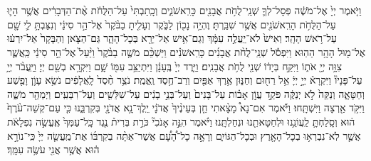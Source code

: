\documentclass[twoside, openany, parskip=half, 11pt]{book}
\begin{document}
\begin{footnotesize}
\begin{multicols}{2}

\\
\\
וַיֹּ֤אמֶר יְיָ֙ אֶל־מֹשֶׁ֔ה פְּסָל־לְךָ֛ שְׁנֵֽי־לֻחֹ֥ת אֲבָנִ֖ים כָּרִֽאשֹׁנִ֑ים וְכָֽתַבְתִּי֙ עַל־הַלֻּחֹ֔ת אֶ֨ת־הַדְּבָרִ֔ים אֲשֶׁ֥ר הָי֛וּ עַל־הַלֻּחֹ֥ת הָרִֽאשֹׁנִ֖ים אֲשֶׁ֥ר שִׁבַּֽרְתָּ׃ וֶהְיֵ֥ה נָכ֖וֹן לַבֹּ֑קֶר וְעָלִ֤יתָ בַבֹּ֨קֶר֙ אֶל־הַ֣ר סִינַ֔י וְנִצַּבְתָּ֥ לִ֛י שָׁ֖ם עַל־רֹ֥אשׁ הָהָֽר׃ וְאִישׁ֙ לֹא־יַֽעֲלֶ֣ה עִמָּ֔ךְ וְגַם־אִ֥ישׁ אַל־יֵרָ֖א בְּכָל־הָהָ֑ר גַּם־הַצֹּ֤אן וְהַבָּקָר֙ אַל־יִרְע֔וּ אֶל־מ֖וּל הָהָ֥ר הַהֽוּא׃ וַיִּפְסֹ֡ל שְׁנֵֽי־לֻחֹ֨ת אֲבָנִ֜ים כָּרִֽאשֹׁנִ֗ים וַיַּשְׁכֵּ֨ם מֹשֶׁ֤ה בַבֹּ֨קֶר֙ וַיַּ֨עַל֙ אֶל־הַ֣ר סִינַ֔י כַּֽאֲשֶׁ֛ר צִוָּ֥ה יְיָ֖ אֹת֑וֹ וַיִּקַּ֣ח בְּיָד֔וֹ שְׁנֵ֖י לֻחֹ֥ת אֲבָנִֽים׃ וַיֵּ֤רֶד יְיָ֙ בֶּֽעָנָ֔ן וַיִּתְיַצֵּ֥ב עִמּ֖וֹ שָׁ֑ם וַיִּקְרָ֥א בְשֵׁ֖ם יְיָ׃ וַיַּֽעֲבֹ֨ר יְיָ֥ עַל־פָּנָיו֘ וַיִּקְרָא֒ יְיָ֣ יְיָ֔ אֵ֥ל רַח֖וּם וְחַנּ֑וּן אֶ֥רֶךְ אַפַּ֖יִם וְרַב־חֶ֥סֶד וֶֽאֱמֶֽת׃ נֹצֵ֥ר חֶ֨סֶד֙ לָֽאֲלָפִ֔ים נֹשֵׂ֥א עָוֹ֛ן וָפֶ֖שַׁע וְחַטָּאָ֑ה וְנַקֵּה֙ לֹ֣א יְנַקֶּ֔ה פֹּקֵ֣ד עֲוֹ֣ן אָב֗וֹת עַל־בָּנִים֙ וְעַל־בְּנֵ֣י בָנִ֔ים עַל־שִׁלֵּשִׁ֖ים וְעַל־רִבֵּעִֽים׃ וַיְמַהֵ֖ר מֹשֶׁ֑ה וַיִּקֹּ֥ד אַ֖רְצָה וַיִּשְׁתָּֽחוּ׃ וַיֹּ֡אמֶר אִם־נָא֩ מָצָ֨אתִי חֵ֤ן בְּעֵינֶ֨יךָ֙ אֲדֹנָ֔י יֵֽלֶךְ־נָ֥א אֲדֹנָ֖י בְּקִרְבֵּ֑נוּ כִּ֤י עַם־קְשֵׁה־עֹ֨רֶף֙ ה֔וּא וְסָֽלַחְתָּ֛ לַֽעֲוֹנֵ֥נוּ וּלְחַטָּאתֵ֖נוּ וּנְחַלְתָּֽנוּ׃ וַיֹּ֗אמֶר הִנֵּ֣ה אָנֹכִי֘ כֹּרֵ֣ת בְּרִית֒ נֶ֤גֶד כָּֽל־עַמְּךָ֙ אֶֽעֱשֶׂ֣ה נִפְלָאֹ֔ת אֲשֶׁ֛ר לֹֽא־נִבְרְא֥וּ בְכָל־הָאָ֖רֶץ וּבְכָל־הַגּוֹיִ֑ם וְרָאָ֣ה כָל־הָ֠עָ֠ם אֲשֶׁר־אַתָּ֨ה בְקִרְבּ֜וֹ אֶת־מַֽעֲשֵׂ֤ה יְיָ֙ כִּֽי־נוֹרָ֣א ה֔וּא אֲשֶׁ֥ר אֲנִ֖י עֹשֶׂ֥ה עִמָּֽךְ׃ 

\end{multicols}
\end{footnotesize}
\end{document}
